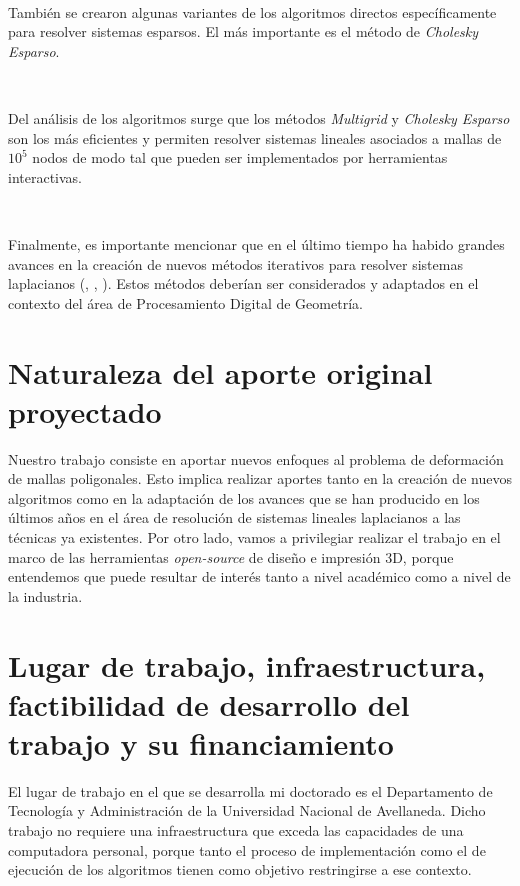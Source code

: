 \documentclass{article}
\begin{document}
\

También se crearon algunas variantes de los algoritmos directos específicamente 
para resolver sistemas esparsos. El más importante es el método de 
\emph{Cholesky Esparso}.

\

Del análisis de los algoritmos \cite{K:2005} surge que los métodos 
\emph{Multigrid} y \emph{Cholesky Esparso} son los más eficientes y 
permiten resolver sistemas lineales asociados a mallas de $10^5$ nodos 
de modo tal que pueden ser implementados por herramientas interactivas.

\

Finalmente, es importante mencionar que en el último tiempo ha
habido grandes avances en la creación de nuevos métodos
iterativos para resolver sistemas laplacianos (\cite{S:2010}, \cite{T:2010}, 
\cite{K:2010}). Estos métodos deberían ser considerados y adaptados en el 
contexto del área de Procesamiento Digital de Geometría.

\section{Naturaleza del aporte original proyectado}

Nuestro trabajo consiste en aportar nuevos enfoques al problema de 
deformación de mallas poligonales. Esto implica realizar aportes tanto en 
la creación de nuevos algoritmos como en la adaptación de los avances 
que se han producido en los últimos años en el área de resolución de 
sistemas lineales laplacianos a las técnicas ya existentes. Por otro lado, 
vamos a privilegiar realizar el trabajo en el marco de las herramientas 
\emph{open-source} de diseño e impresión 3D, porque entendemos que puede 
resultar de interés tanto a nivel académico como a nivel de la industria. 

\section{Lugar de trabajo, infraestructura, factibilidad de desarrollo del trabajo y su financiamiento}

El lugar de trabajo en el que se desarrolla mi doctorado es el Departamento 
de Tecnología y Administración de la Universidad Nacional de Avellaneda. 
Dicho trabajo no requiere una infraestructura que exceda las capacidades 
de una computadora personal, porque tanto el proceso de implementación como 
el de ejecución de los algoritmos tienen como objetivo restringirse a ese 
contexto.
\end{document}
